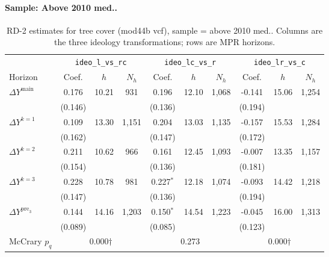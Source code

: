 \documentclass[11pt]{article}
\begin{document}
\paragraph{Sample: Above 2010 med..}
\begin{table}[H]
\centering
\scriptsize
\caption{RD-2 estimates for tree cover (mod44b vcf), sample = above 2010 med..
Columns are the three ideology transformations; rows are MPR horizons.}
\label{tab:rd2_tree_cover_above}
\begin{tabular}{l ccc ccc ccc}
\toprule
 & \multicolumn{3}{c}{\texttt{ideo\_l\_vs\_rc}}
 & \multicolumn{3}{c}{\texttt{ideo\_lc\_vs\_r}}
 & \multicolumn{3}{c}{\texttt{ideo\_lr\_vs\_c}} \\
\cmidrule(lr){2-4} \cmidrule(lr){5-7} \cmidrule(lr){8-10}
Horizon & Coef. & $h$ & $N_h$ & Coef. & $h$ & $N_h$ & Coef. & $h$ & $N_h$ \\
\midrule
$\Delta Y^{\text{main}}$ & 0.176 & 10.21 & 931 & 0.196 & 12.10 & 1,068 & -0.141 & 15.06 & 1,254 \\
 & (0.146) &  &  & (0.136) &  &  & (0.194) &  &  \\
\addlinespace[1pt]
$\Delta Y^{k=1}$ & 0.109 & 13.30 & 1,151 & 0.204 & 13.03 & 1,135 & -0.157 & 15.53 & 1,284 \\
 & (0.162) &  &  & (0.147) &  &  & (0.172) &  &  \\
\addlinespace[1pt]
$\Delta Y^{k=2}$ & 0.211 & 10.62 & 966 & 0.161 & 12.45 & 1,093 & -0.007 & 13.35 & 1,157 \\
 & (0.154) &  &  & (0.136) &  &  & (0.181) &  &  \\
\addlinespace[1pt]
$\Delta Y^{k=3}$ & 0.228 & 10.78 & 981 & 0.227$^{*}$ & 12.18 & 1,074 & -0.093 & 14.42 & 1,218 \\
 & (0.147) &  &  & (0.136) &  &  & (0.194) &  &  \\
\addlinespace[1pt]
$\Delta Y^{\text{pre}_3}$ & 0.144 & 14.16 & 1,203 & 0.150$^{*}$ & 14.54 & 1,223 & -0.045 & 16.00 & 1,313 \\
 & (0.089) &  &  & (0.085) &  &  & (0.123) &  &  \\
\addlinespace[1pt]
\midrule
McCrary $p_q$ & \multicolumn{3}{c}{0.000$\dagger$} & \multicolumn{3}{c}{0.273} & \multicolumn{3}{c}{0.000$\dagger$} \\
\bottomrule
\end{tabular}
\end{table}
\end{document}
